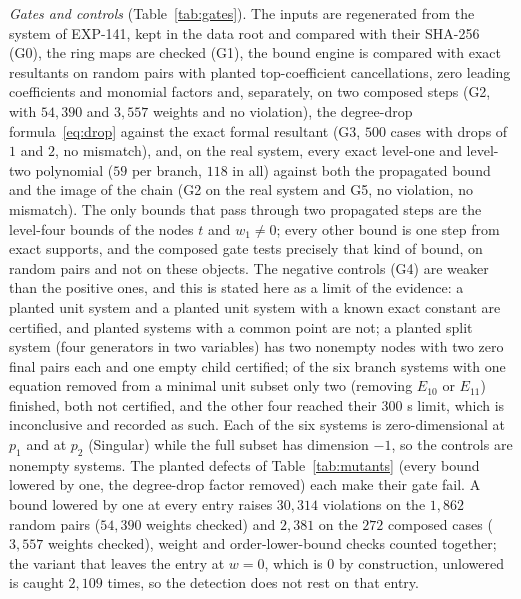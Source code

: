 \documentclass[11pt]{article}
\theoremstyle{remark}
\begin{document}


\emph{Gates and controls} (Table~\ref{tab:gates}). The inputs are regenerated from the system of EXP-141, kept in the data root and compared with their SHA-256 (G0), the ring maps are checked (G1), the bound engine is compared with exact resultants on random pairs with planted top-coefficient cancellations, zero leading coefficients and monomial factors and, separately, on two composed steps (G2, with
$54{,}390$ and $3{,}557$ weights and no violation), the degree-drop formula~\eqref{eq:drop} against the exact formal resultant (G3, $500$ cases with drops of $1$ and $2$, no mismatch), and, on the real system, every exact level-one and level-two polynomial ($59$ per branch, $118$ in all) against both the propagated bound and the image of the chain (G2 on the real system and G5, no violation, no mismatch).
The only bounds that pass through two propagated steps are the level-four bounds of the nodes $t$ and $w_1\ne0$; every other bound is one step from exact supports, and the composed gate tests precisely that kind of bound, on random pairs and not on these objects. The negative controls (G4) are weaker than the positive ones, and this is stated here as a limit of the evidence: a planted unit system and a planted
unit system with a known exact constant are certified, and planted systems with a common point are not; a planted split system (four generators in two variables) has two nonempty nodes with two zero final pairs each and one empty child certified; of the six branch systems with one equation removed from a minimal unit subset only two (removing $E_{10}$ or $E_{11}$) finished, both not certified, and the other four reached their $300$ s limit,
which is inconclusive and recorded as such. Each of the six systems is zero-dimensional at $p_1$ and at $p_2$ (Singular) while the full subset has dimension $-1$, so the controls are nonempty systems. The planted defects of Table~\ref{tab:mutants} (every bound lowered by one, the degree-drop factor removed) each make their gate fail.
A bound lowered by one at every entry raises $30{,}314$ violations on the $1{,}862$ random pairs ($54{,}390$ weights checked) and $2{,}381$ on the $272$ composed cases ($3{,}557$ weights checked), weight and order-lower-bound checks counted together; the variant that leaves the entry at $w=0$, which is $0$ by construction, unlowered is caught $2{,}109$ times, so the detection does not rest on that entry.



\end{document}
